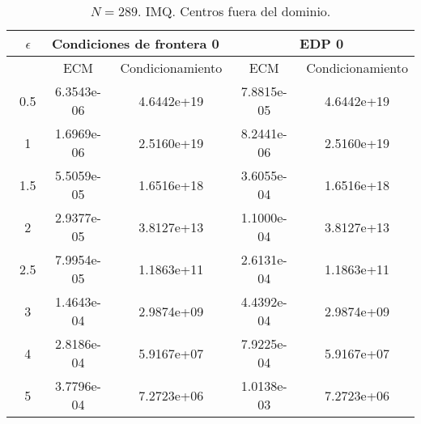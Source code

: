 \documentclass[11pt,a4paper]{article}
\begin{document}
\begin{table}
\begin{center}
\caption{$N=289$. IMQ. Centros fuera del dominio.}
\begin{tabular}{|c|c|c|c|c|}
\hline
\ $\epsilon$ & \multicolumn{2}{|c|}{Condiciones de frontera 0} & \multicolumn{2}{|c|}{EDP 0} \\
\hline
\ & ECM & Condicionamiento & ECM & Condicionamiento \\
\hline
\ 0.5 & 6.3543e-06 & 4.6442e+19 &7.8815e-05& 4.6442e+19 \\
\ 1 & 1.6969e-06 & 2.5160e+19 &8.2441e-06 & 2.5160e+19 \\
\ 1.5 & 5.5059e-05 & 1.6516e+18 & 3.6055e-04 & 1.6516e+18 \\
\ 2 & 2.9377e-05 & 3.8127e+13 & 1.1000e-04 & 3.8127e+13 \\
\ 2.5 & 7.9954e-05 & 1.1863e+11 &  2.6131e-04 &  1.1863e+11 \\
\ 3 & 1.4643e-04 &   2.9874e+09 & 4.4392e-04 & 2.9874e+09 \\
\ 4 & 2.8186e-04 &  5.9167e+07 &  7.9225e-04& 5.9167e+07 \\
\ 5 & 3.7796e-04 & 7.2723e+06 & 1.0138e-03 & 7.2723e+06 \\

\hline
\end{tabular}
\end{center}
\end{table}
\end{document}

